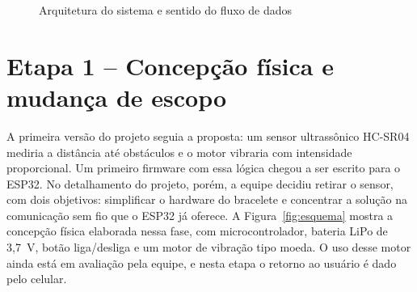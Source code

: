 \begin{figure}[htb]
\centering
\caption{Arquitetura do sistema e sentido do fluxo de dados}
\label{fig:arquitetura}
\end{figure}

\section{Etapa 1 -- Concepção física e mudança de escopo}
\label{sec:etapa1}

A primeira versão do projeto seguia a proposta: um sensor ultrassônico HC-SR04 mediria a distância até obstáculos e o motor vibraria com intensidade proporcional. Um primeiro firmware com essa lógica chegou a ser escrito para o ESP32. No detalhamento do projeto, porém, a equipe decidiu retirar o sensor, com dois objetivos: simplificar o hardware do bracelete e concentrar a solução na comunicação sem fio que o ESP32 já oferece. A Figura~\ref{fig:esquema} mostra a concepção física elaborada nessa fase, com microcontrolador, bateria LiPo de 3,7~V, botão liga/desliga e um motor de vibração tipo moeda. O uso desse motor ainda está em avaliação pela equipe, e nesta etapa o retorno ao usuário é dado pelo celular.

